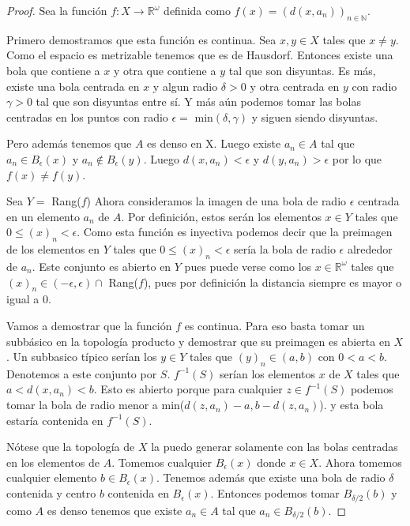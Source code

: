 \documentclass[letter,twoside,12pt]{article}
\begin{document}
\begin{enumerate}
\begin{proof}
Sea la función $ f: X \to \mathbb{R}^{\omega} $ definida como $ f(x) = (d(x,a_n))_{n \in \mathbb{N}} $.

Primero demostramos que esta función es continua. Sea $ x,y  \in X$ tales que $ x \not = y $. Como el espacio es metrizable tenemos que es de Hausdorf. Entonces existe una bola que contiene a $x$ y otra que contiene a $y$ tal que son disyuntas. Es más, existe una bola centrada en $x$ y algun radio $ \delta >0 $ y otra centrada en $y$ con radio $ \gamma> 0 $ tal que son disyuntas entre sí. Y más aún podemos tomar las bolas centradas en los puntos con radio $\epsilon =$ min$(\delta,\gamma)$ y siguen siendo disyuntas.

Pero además tenemos que $A$ es denso en X. Luego existe $a_n \in A$ tal que $ a_n \in B_\epsilon(x) $ y $ a_n \not \in B_\epsilon(y) $. Luego $ d(x,a_n)<\epsilon $ y $ d(y,a_n)>\epsilon $ por lo que $ f(x) \not = f(y)$.   

Sea $ Y  = $ Rang($ f $)
Ahora consideramos la imagen de una bola de radio $ \epsilon $ centrada en un elemento $ a_n $ de $ A $. Por definición, estos serán los elementos $x \in Y $ tales que $ 0 \leq (x)_n< \epsilon $. Como esta función es inyectiva podemos decir que la preimagen de los elementos en $Y$ tales que $0 \leq (x)_n< \epsilon$ sería la bola de radio $ \epsilon $ alrededor de $ a_n $. Este conjunto es abierto en $Y$ pues puede verse como los $ x \in  \mathbb{R}^{\omega}$ tales que $ (x)_n \in (-\epsilon,\epsilon) \cap $ Rang($ f $), pues por definición la distancia siempre es mayor o igual a 0. 

Vamos a demostrar que la función $ f $ es continua. Para eso basta tomar un subbásico en la topología producto y demostrar que su preimagen es abierta en $X$. Un subbasico típico serían los $y \in Y$  tales que $  (y)_n \in (a,b)$ con $ 0<a<b $. Denotemos a este conjunto por $ S $. $ f^{-1}(S) $ serían los elementos $ x $ de $ X $ tales que $a<d(x,a_n)<b $. Esto es abierto porque para cualquier $ z \in f^{-1}(S) $ podemos tomar la bola de radio menor a min($ d(z,a_n)-a, b-d(z,a_n) $). y esta bola estaría contenida en $ f^{-1}(S) $.

Nótese que la topología de $ X $ la puedo generar solamente con las bolas centradas en los elementos de $ A $. Tomemos cualquier $B_\epsilon(x)$ donde $x \in X$. Ahora tomemos cualquier elemento $ b  \in B_\epsilon(x)$. Tenemos además que existe una bola de radio $ \delta $ contenida y centro $b$ contenida en $ B_\epsilon(x) $. Entonces podemos tomar $ B_{\delta/2}(b) $ y como $A$ es denso tenemos que existe $ a_n \in A$ tal que $a_n \in  B_{\delta/2}(b) $.


\end{proof}
\end{enumerate}
\end{document}
